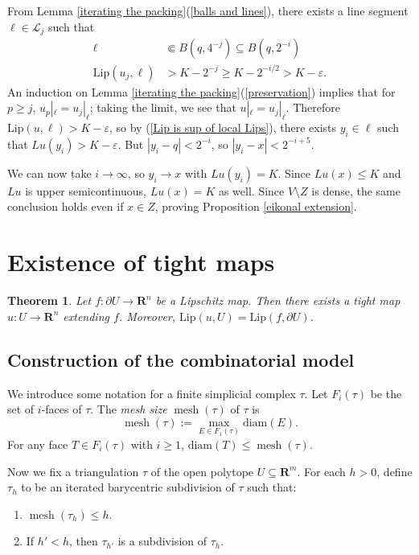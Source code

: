 \documentclass[reqno,11pt]{amsart}
\newcommand{\RR}{\mathbf{R}}
\DeclareMathOperator{\mesh}{mesh}
\newcommand{\diam}{\mathrm{diam}}
\newcommand{\Lip}{\mathrm{Lip}}
\newcommand{\dfn}[1]{\emph{#1}\index{#1}}
\newtheorem{theorem}{Theorem}[section]
\theoremstyle{definition}
\numberwithin{equation}{section}
\begin{document}
From Lemma \ref{iterating the packing}(\ref{balls and lines}), there exists a line segment $\ell \in \mathscr L_j$ such that
\begin{align*}
\ell &\Subset B(q, 4^{-j}) \subseteq B(q, 2^{-i}) \\
\Lip(u_j, \ell) &> K - 2^{-j} \geq K - 2^{-i/2} > K - \varepsilon.
\end{align*}
An induction on Lemma \ref{iterating the packing}(\ref{preservation}) implies that for $p \geq j$, $u_p|_\ell = u_j|_\ell$; taking the limit, we see that $u|_\ell = u_j|_\ell$.
Therefore $\Lip(u, \ell) > K - \varepsilon$, so by (\ref{Lip is sup of local Lips}), there exists $y_i \in \ell$ such that $Lu(y_i) > K - \varepsilon$.
But $|y_i - q| < 2^{-i}$, so $|y_i - x| < 2^{-i + 5}$.

We can now take $i \to \infty$, so $y_i \to x$ with $Lu(y_i) = K$.
Since $Lu(x) \leq K$ and $Lu$ is upper semicontinuous, $Lu(x) = K$ as well.
Since $V \setminus Z$ is dense, the same conclusion holds even if $x \in Z$, proving Proposition \ref{eikonal extension}.



\section{Existence of tight maps}
\begin{theorem}\label{existence of tight maps}
Let $f: \partial U \to \RR^n$ be a Lipschitz map.
Then there exists a tight map $u: U \to \RR^n$ extending $f$.
Moreover, $\Lip(u, U) = \Lip(f, \partial U)$.
\end{theorem}

\subsection{Construction of the combinatorial model}
We introduce some notation for a finite simplicial complex $\tau$.
Let $F_i(\tau)$ be the set of $i$-faces of $\tau$.
The \dfn{mesh size} $\mesh(\tau)$ of $\tau$ is 
$$\mesh(\tau) := \max_{E \in F_1(\tau)} \diam(E).$$
For any face $T \in F_i(\tau)$ with $i \geq 1$, $\diam(T) \leq \mesh(\tau)$.

Now we fix a triangulation $\tau$ of the open polytope $U \subseteq \RR^m$.
For each $h > 0$, define $\tau_h$ to be an iterated barycentric subdivision of $\tau$ such that:
\begin{enumerate}
\item $\mesh(\tau_h) \leq h$.
\item If $h' < h$, then $\tau_{h'}$ is a subdivision of $\tau_h$.
\end{enumerate}
\end{document}
